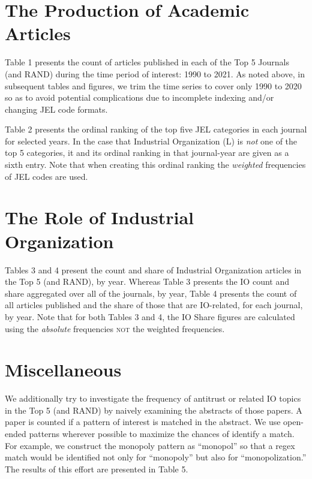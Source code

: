 \documentclass[11pt, letterpaper, twoside]{article}
\begin{document}
\newpage

\appendix
\section{The Production of Academic Articles}
Table 1 presents the count of articles published in each of the Top 5 Journals (and RAND) during the time period of interest: 1990 to 2021. As noted above, in subsequent tables and figures, we trim the time series to cover only 1990 to 2020 so as to avoid potential complications due to incomplete indexing and/or changing JEL code formats.



Table 2 presents the ordinal ranking of the top five JEL categories in each journal for selected years. In the case that Industrial Organization (L) is \textit{not} one of the top 5 categories, it and its ordinal ranking in that journal-year are given as a sixth entry. Note that when creating this ordinal ranking the \textit{weighted} frequencies of JEL codes are used.  
\newpage
\begin{landscape}
    \thispagestyle{empty}
    
\end{landscape}

\section{The Role of Industrial Organization}
Tables 3 and 4 present the count and share of Industrial Organization articles in the Top 5 (and RAND), by year. Whereas Table 3 presents the IO count and share aggregated over all of the journals, by year, Table 4 presents the count of all articles published and the share of those that are IO-related, for each journal, by year. Note that for both Tables 3 and 4, the IO Share figures are calculated using the \textit{absolute} frequencies \textsc{not} the weighted frequencies.




\newpage
\section{Miscellaneous}
We additionally try to investigate the frequency of antitrust or related IO topics in the Top 5 (and RAND) by naively examining the abstracts of those papers. A paper is counted if a pattern of interest is matched in the abstract. We use open-ended patterns wherever possible to maximize the chances of identify a match. For example, we construct the monopoly pattern as ``monopol'' so that a regex match would be identified not only for ``monopoly'' but also for ``monopolization.'' The results of this effort are presented in Table 5.
\end{document}
